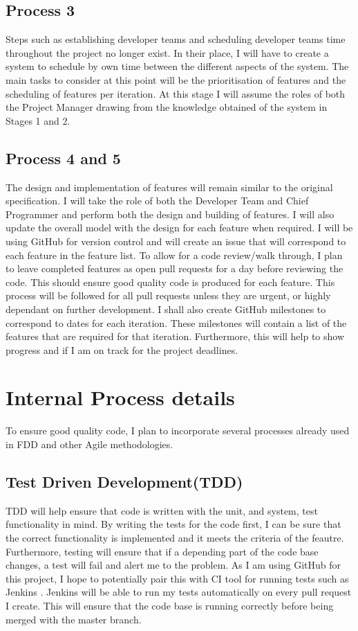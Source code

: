 \documentclass{article}
\begin{document}
\subsection{Process 3}
Steps such as establishing developer teams and scheduling developer teams time throughout the project no longer exist. In their place, I will have to create a system to schedule by own time between the different aspects of the system. The main tasks to consider at this point will be the prioritisation of features and the scheduling of features per iteration. At this stage I will assume the roles of both the Project Manager drawing from the knowledge obtained of the system in Stages 1 and 2.

\subsection{Process 4 and 5}
The design and implementation of features will remain similar to the original specification. I will take the role of both the Developer Team and Chief Programmer and perform both the design and building of features. I will also update the overall model with the design for each feature when required. I will be using GitHub for version control and will create an issue that will correspond to each feature in the feature list. To allow for a code review/walk through, I plan to leave completed features as open pull requests for a day before reviewing the code. This should ensure good quality code is produced for each feature. This process will be followed for all pull requests unless they are urgent, or highly dependant on further development. I shall also create GitHub milestones to correspond to dates for each iteration. These milestones will contain a list of the features that are required for that iteration. Furthermore, this will help to show progress and if I am on track for the project deadlines.

\newpage

\section{Internal Process details}
To ensure good quality code, I plan to incorporate several processes already used in FDD and other Agile methodologies.

\subsection{Test Driven Development(TDD)}
TDD will help ensure that code is written with the unit, and system, test functionality in mind. By writing the tests for the code first, I can be sure that the correct functionality is implemented and it meets the criteria of the feautre. Furthermore, testing will ensure that if a depending part of the code base changes, a test will fail and alert me to the problem. As I am using GitHub for this project, I hope to potentially pair this with CI tool for running tests such as Jenkins \cite{jenkins}. Jenkins will be able to run my tests automatically on every pull request I create. This will ensure that the code base is running correctly before being merged with the master branch.
\end{document}
